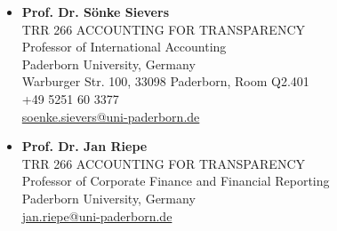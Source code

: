 \documentclass[11pt, a4paper]{article}
\begin{document}
\begin{itemize}[leftmargin=1.5em, label={}, itemsep=12pt]
    \item \textbf{Prof. Dr. Sönke Sievers} \\
    TRR 266 ACCOUNTING FOR TRANSPARENCY \\
    Professor of International Accounting \\
    Paderborn University, Germany \\
    Warburger Str. 100, 33098 Paderborn, Room Q2.401 \\ 
    +49 5251 60 3377 \\
    \href{mailto:soenke.sievers@uni-paderborn.de}{soenke.sievers@uni-paderborn.de}

    \item \textbf{Prof. Dr. Jan Riepe} \\
    TRR 266 ACCOUNTING FOR TRANSPARENCY \\
    Professor of Corporate Finance and Financial Reporting \\
    Paderborn University, Germany\\
    \href{mailto:jan.riepe@uni-paderborn.de}{jan.riepe@uni-paderborn.de}
\end{itemize}
\end{document}
